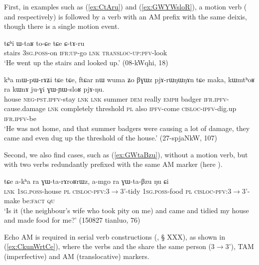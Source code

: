 First, in examples such as (\ref{ex:CtAru}) and (\ref{ex:GWYWsloR}), a motion verb ( and  respectively) is followed by a verb with an AM prefix with the same deixis, though there is a single motion event.

\begin{exe}
\ex \label{ex:CtAru}
\gll tɕʰi ɯ-taʁ to-ɕe tɕe ɕ-tɤ-ru   \\
stairs \textsc{3sg}.\textsc{poss}-on \textsc{ifr}:\textsc{up}-go \textsc{lnk}  \textsc{transloc}-\textsc{up}:\textsc{pfv}-look \\
\glt `He went up the stairs and looked up.'  (08-kWqhi, 18)
\end{exe}

\begin{exe}
\ex \label{ex:GWYWsloR}
\gll kʰa mɯ-pɯ-rɤʑi tɕe tɕe, ftɕar nɯ wuma ʑo βɣɯz pjɤ-rɯŋɯŋɤn tɕe maka,
kɯmtʰoʁ ra kɯnɤ ju-ɣi ɣɯ-ɲɯ-sloʁ pjɤ-ŋu. \\
house \textsc{neg}-\textsc{pst}.\textsc{ipfv}-stay \textsc{lnk} \textsc{lnk} summer \textsc{dem} really \textsc{emph} badger \textsc{ifr}.\textsc{ipfv}-cause.damage \textsc{lnk} completely threshold \textsc{pl} also \textsc{ipfv}-come \textsc{cisloc}-\textsc{ipfv}-dig.up \textsc{ifr}.\textsc{ipfv}-be \\
\glt `He was not home, and that summer badgers were causing a lot of damage, they came and even dug up the threshold of the house.'  (27-spjaNkW, 107)
\end{exe}

Second, we also find cases, such as (\ref{ex:GWtaBzu}), without a motion verb, but with two verbs redundantly prefixed with the same AM marker (here ).

\begin{exe}
\ex \label{ex:GWtaBzu}
\gll  tɕe a-kʰa ra ɣɯ-ta-rɤroʁrɯz, 	a-mgo  ra ɣɯ-ta-βzu ŋu ɕi \\
\textsc{lnk} \textsc{1sg}.\textsc{poss}-house \textsc{pl} \textsc{cisloc}-\textsc{pfv}:3$\rightarrow$3'-tidy 
 \textsc{1sg}.\textsc{poss}-food \textsc{pl} \textsc{cisloc}-\textsc{pfv}:3$\rightarrow$3'-make be:\textsc{fact} \textsc{qu} \\ 
\glt `Is it (the neighbour's wife who took pity on me) and came and tidied my house and made food for me?'  (150827 tianluo, 76)
\end{exe}


Echo AM is required in serial verb constructions (\citealt[253-255]{jacques16complementation}, § XXX), as shown in (\ref{ex:CkunWrtCe}), where the verbs  and the  share the same person (3$\rightarrow$3'), TAM (imperfective) and AM (translocative) markers.

